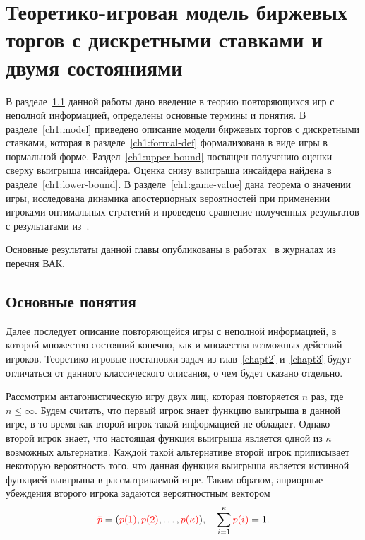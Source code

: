 \chapter{Теоретико-игровая модель биржевых торгов с дискретными ставками и двумя состояниями} \label{chapt1} 
{
\newcommand{\symm}[1]{\overline{#1}}
\newcommand{\pEven}[1][k]{p^0_{#1}}
\newcommand{\pOdd}[1][k]{p^{\beta}_{#1}}
\newcommand{\fEven}[1][k]{\phi^0_{#1}}
\newcommand{\fOdd}[1][k]{\phi^{\beta}_{#1}}

В разделе~\ref{ch1:intro} данной работы дано введение в теорию повторяющихся игр с неполной информацией, определены основные термины и понятия.
В разделе~\ref{ch1:model} приведено описание модели биржевых торгов с дискретными ставками, которая в разделе~\ref{ch1:formal-def} формализована в виде игры в нормальной форме.
Раздел~\ref{ch1:upper-bound} посвящен получению оценки сверху выигрыша инсайдера.
Оценка снизу выигрыша инсайдера найдена в разделе~\ref{ch1:lower-bound}.
В разделе~\ref{ch1:game-value} дана теорема о значении игры, исследована динамика апостериорных вероятностей при применении игроками оптимальных стратегий и проведено сравнение полученных результатов с результатами из~\cite{domansky07}.

Основные результаты данной главы опубликованы в работах~\cite{pyanykh14,pyanykh16:discr:ru} в журналах из перечня ВАК.

\section{Основные понятия}\label{ch1:intro}
Далее последует описание повторяющейся игры с неполной информацией, в которой множество состояний конечно, как и множества возможных действий игроков.
Теоретико-игровые постановки задач из глав~\ref{chapt2} и~\ref{chapt3} будут отличаться от данного классического описания, о чем будет сказано отдельно.

Рассмотрим антагонистическую игру двух лиц, которая повторяется $n$ раз, где $n\leq \infty$.
Будем считать, что первый игрок знает функцию выигрыша в данной игре, в то время как второй игрок такой информацией не обладает.
Однако второй игрок знает, что настоящая функция выигрыша является одной из $\kappa$ возможных альтернатив.
Каждой такой альтернативе второй игрок приписывает некоторую вероятность того, что данная функция выигрыша является истинной функцией выигрыша в рассматриваемой
игре.
Таким образом, априорные убеждения второго игрока задаются вероятностным вектором
\[
  \pd = (\pc{1}, \pc{2}, \ldots, \pc{\kappa}),\quad \sum_{i=1}^\kappa \pc{i} = 1.
\]

}
